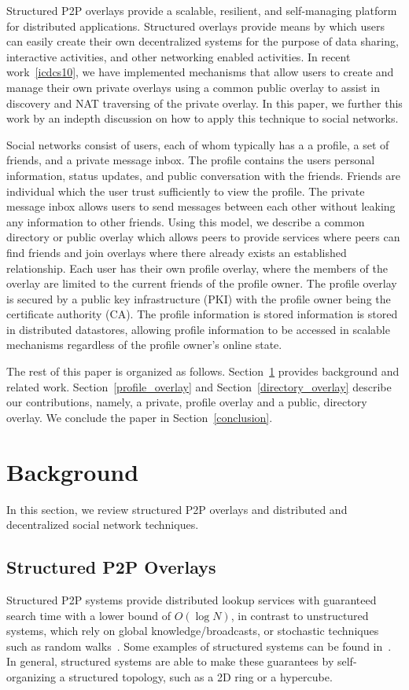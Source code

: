 \documentclass[letterpaper,twocolumn,10pt]{article}
\begin{document}
Structured P2P overlays provide a scalable, resilient, and self-managing
platform for distributed applications.  Structured overlays provide means
by which users can easily create their own decentralized systems for the
purpose of data sharing, interactive activities, and other networking enabled
activities.  In recent work~\ref{icdcs10}, we have implemented mechanisms that
allow users to create and manage their own private overlays using a common
public overlay to assist in discovery and NAT traversing of the private overlay.
In this paper, we further this work by an indepth discussion on how to apply
this technique to social networks.

Social networks consist of users, each of whom typically has a a profile, a set
of friends, and a private message inbox.  The profile contains the users
personal information, status updates, and public conversation with the friends.
Friends are individual which the user trust sufficiently to view the profile.
The private message inbox allows users to send messages between each other
without leaking any information to other friends.  Using this model, we
describe a common directory or public overlay which allows peers to provide
services where peers can find friends and join overlays where there already
exists an established relationship.  Each user has their own profile overlay,
where the members of the overlay are limited to the current friends of the
profile owner.  The profile overlay is secured by a public key infrastructure
(PKI) with the profile owner being the certificate authority (CA).  The profile
information is stored information is stored in distributed datastores, allowing
profile information to be accessed in scalable mechanisms regardless of the
profile owner's online state.

The rest of this paper is organized as follows.  Section~\ref{background}
provides background and related work.  Section~\ref{profile_overlay} and
Section~\ref{directory_overlay} describe our contributions, namely, a
private, profile overlay and a public, directory overlay.  We conclude the
paper in Section~\ref{conclusion}.

\section{Background}
\label{background}
In this section, we review structured P2P overlays and distributed and
decentralized social network techniques.
\subsection{Structured P2P Overlays}
Structured P2P systems provide distributed lookup services with guaranteed
search time with a lower bound of $O(\log N)$, in contrast to unstructured
systems, which rely on global knowledge/broadcasts, or stochastic techniques
such as random walks~\cite{unstructured_v_structured}.  Some examples of
structured systems can be found in~\cite{pastry, chord, symphony, kademlia,
can}.  In general, structured systems are able to make these guarantees by
self-organizing a structured topology, such as a 2D ring or a hypercube.
\end{document}
